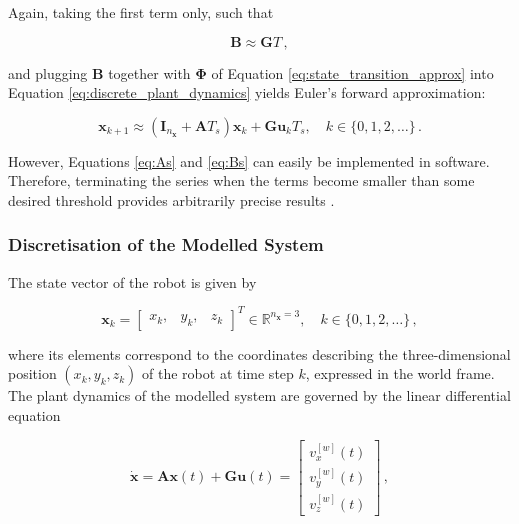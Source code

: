  \noindent
 Again, taking the first term only, such that
 
 \begin{equation}
\bm{B} \approx \bm{G}T\,,
\end{equation}

\noindent
and plugging $\bm{B}$ together with $\bm{\Phi}$ of Equation \ref{eq:state_transition_approx} into Equation \ref{eq:discrete_plant_dynamics} yields Euler’s forward approximation:

\begin{equation}\label{eq:euler_approximation}
  \bm{x}_{k + 1} \approx (\bm{I}_{n_{\bm{x}}} + \bm{A}T_s) \bm{x}_k + \bm{G}\bm{u}_k T_s, \quad k \in \{0, 1, 2, \dots\}\,.
\end{equation}

\noindent
However, Equations \ref{eq:As} and \ref{eq:Bs} can easily be implemented in software. Therefore, terminating the series when the terms become smaller than some desired threshold provides arbitrarily precise results \cite{lewis1992applied}.


\subsubsection{Discretisation of the Modelled System}

The state vector of the robot is given by
 
\begin{equation} \label{eq:state_vector}
  \bm{x}_k = \begin{bmatrix}
  	x_k, & y_k, & z_k
  \end{bmatrix}^T \in \mathbb{R}^{n_{\bm{x}}=3}, \quad k \in \{0, 1, 2, \dots\}\,,
\end{equation}

\noindent
where its elements correspond to the coordinates describing the three-dimensional position $(x_k, y_k, z_k)$ of the robot at time step $k$, expressed in the world frame.
The plant dynamics of the modelled system are governed by the linear differential equation

\begin{equation} \label{eq:state_vector_derivative}
  \dot{\bm{x}} = \bm{A} \bm{x}(t) + \bm{G} \bm{u}(t) = \begin{bmatrix}
  v_x^{[w]}(t) \\
  v_y^{[w]}(t) \\ 
  v_z^{[w]}(t) \end{bmatrix}\,,
\end{equation}

